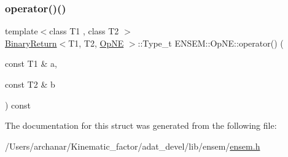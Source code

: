 \mbox{\label{structENSEM_1_1OpNE_a7591dc1f0aa2c67130ef3ec7a406f54e}} 
\subsubsection{\texorpdfstring{operator()()}{operator()()}\hspace{0.1cm}{\footnotesize\ttfamily [2/2]}}
{\footnotesize\ttfamily template$<$class T1 , class T2 $>$ \\
\mbox{\hyperlink{structENSEM_1_1BinaryReturn}{Binary\+Return}}$<$T1, T2, \mbox{\hyperlink{structENSEM_1_1OpNE}{Op\+NE}} $>$\+::Type\+\_\+t E\+N\+S\+E\+M\+::\+Op\+N\+E\+::operator() (\begin{DoxyParamCaption}\item[{const T1 \&}]{a,  }\item[{const T2 \&}]{b }\end{DoxyParamCaption}) const\hspace{0.3cm}{\ttfamily [inline]}}



The documentation for this struct was generated from the following file\+:\begin{DoxyCompactItemize}
\item 
/\+Users/archanar/\+Kinematic\+\_\+factor/adat\+\_\+devel/lib/ensem/\mbox{\hyperlink{lib_2ensem_2ensem_8h}{ensem.\+h}}\end{DoxyCompactItemize}
